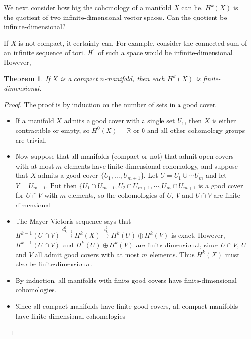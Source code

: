 \documentclass[12pt]{amsbook}
\newcommand{\R}{{\mathbb R}}
\newtheorem{thm}{Theorem}[section]
\theoremstyle{definition}
\begin{document}
We next consider how big the cohomology of a manifold $X$ can be. $H^k(X)$ is the quotient of two infinite-dimensional vector
spaces. Can the quotient be infinite-dimensional? 

If $X$ is not compact, it certainly can. For example, consider the connected sum of an infinite sequence of tori. $H^1$ of such
a space would be infinite-dimensional. However, 

\begin{thm} If $X$ is a compact $n$-manifold, then each $H^k(X)$ is finite-dimensional. \end{thm}

\begin{proof} The proof is by induction on the number of sets in a good cover. 

\begin{itemize}
\item If a manifold $X$ admits a good cover with a single set $U_1$, then $X$ is either contractible or empty, so $H^0(X)=\R$ or 0 and all other cohomology groups are trivial. 
\item Now suppose that all manifolds (compact or not) that admit open covers with at most $m$ elements have finite-dimensional 
cohomology, and suppose that $X$ admits a good cover $\{U_1, \ldots, U_{m+1}\}$. Let $U=U_1 \cup \cdots U_m$ and
let $V=U_{m+1}$.  But then $\{U_1\cap U_{m+1}, U_2\cap U_{m+1}, \cdots, 
U_m\cap U_{m+1}$ is a good cover for $U\cap V$ with $m$ elements, so the cohomologies of $U$, $V$ and $U\cap V$ 
are finite-dimensional.
\item The Mayer-Vietoris sequence says that $H^{k-1}(U \cap V) \xrightarrow {d_{k-1}^\sharp} H^{k}(X) \xrightarrow {i_{k}^\sharp} H^k(U) \oplus H^k(V)$ is exact. However, $H^{k-1}(U\cap V)$ and $H^k(U) \oplus H^k(V)$ are finite 
dimensional, since $U\cap V$, $U$ and $V$ all admit good covers with at most $m$ elements. Thus $H^k(X)$ must also 
be finite-dimensional. 
\item By induction, all manifolds with finite good covers have finite-dimensional cohomologies.
\item Since all compact manifolds have finite good covers, all compact manifolds have finite-dimensional cohomologies.
\end{itemize}
\end{proof}
\end{document}
